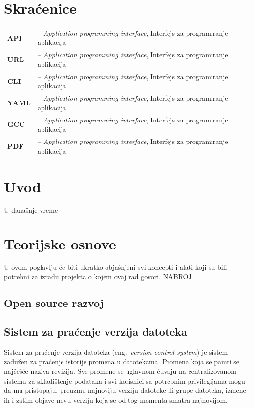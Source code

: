 \documentclass[12pt]{report}
\renewcommand{\chaptermark}[1]{\markboth{#1}{}}
\newcommand\frontmatter{
    \cleardoublepage{}
    \pagenumbering{Roman}
    \setlength{\parskip}{0pt}
}
\newcommand\mainmatter{
    \cleardoublepage{}
    \pagenumbering{arabic}
    \setlength{\parskip}{2mm}
    \titleformat{\chapter}{\normalfont\Large\bf\sffamily\raggedleft}{\thechapter.}{12pt}{}
}
\begin{document}
\frontmatter{}

\renewcommand{\MakeUppercase}[1]{#1}
\tableofcontents

\listoffigures

\chapter*{Skraćenice}
\chaptermark{Skraćenice}
\begin{tabular}{ l l }
    \textbf{API} & -- \textit{Application programming interface}, Interfejs za programiranje aplikacija \\
    \textbf{URL} & -- \textit{Application programming interface}, Interfejs za programiranje aplikacija \\
    \textbf{CLI} & -- \textit{Application programming interface}, Interfejs za programiranje aplikacija \\
    \textbf{YAML} & -- \textit{Application programming interface}, Interfejs za programiranje aplikacija \\
    \textbf{GCC} & -- \textit{Application programming interface}, Interfejs za programiranje aplikacija \\
    \textbf{PDF} & -- \textit{Application programming interface}, Interfejs za programiranje aplikacija \\
\end{tabular}

\mainmatter{}
\chapter{Uvod}
U današnje vreme

\chapter{Teorijske osnove}
U ovom poglavlju će biti ukratko objašnjeni svi koncepti i alati koji su bili potrebni za izradu projekta o kojem ovaj rad govori. NABROJ
\section{Open source razvoj}
\section{Sistem za praćenje verzija datoteka}
Sistem za praćenje verzija datoteka (eng.\ \textit{version control system}) je sistem zadužen za praćenje istorije promena u datotekama. Promena koja se pamti se najčešće naziva revizija. Sve promene se uglavnom čuvaju na centralizovanom sistemu za skladištenje podataka i svi korisnici sa potrebnim privilegijama mogu da mu pristupaju, preuzmu najnoviju verziju datoteke ili grupe datoteka, izmene ih i zatim objave novu verziju koja se od tog momenta smatra najnovijom.
\end{document}
